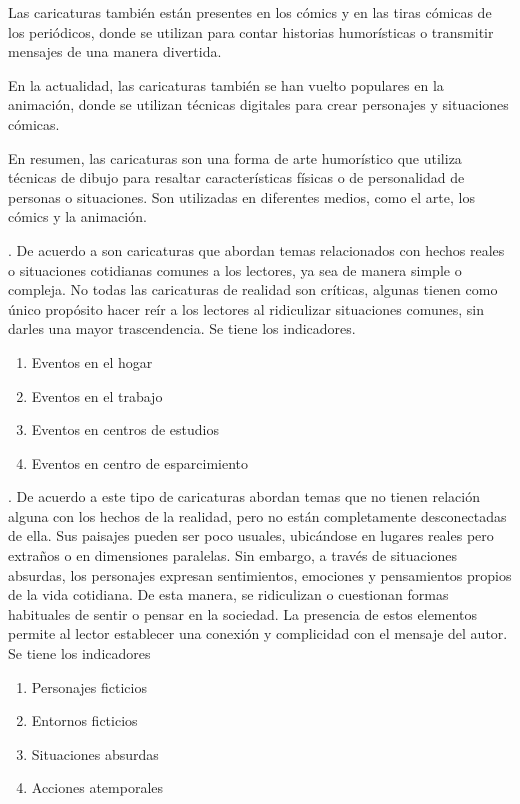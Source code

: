 \documentclass[12pt,a4paper]{article}
\begin{document}
Las caricaturas también están presentes en los cómics y en las tiras cómicas de los periódicos, donde se utilizan para contar historias humorísticas o transmitir mensajes de una manera divertida.

En la actualidad, las caricaturas también se han vuelto populares en la animación, donde se utilizan técnicas digitales para crear personajes y situaciones cómicas.

En resumen, las caricaturas son una forma de arte humorístico que utiliza técnicas de dibujo para resaltar características físicas o de personalidad de personas o situaciones. Son utilizadas en diferentes medios, como el arte, los cómics y la animación.

\noindent\textbf{\dimi}. De acuerdo a \cite{gray_caricaturas_2015}
son caricaturas que abordan temas relacionados con hechos reales o situaciones cotidianas comunes a los lectores, ya sea de manera simple o compleja. No todas las caricaturas de realidad son críticas, algunas tienen como único propósito hacer reír a los lectores al ridiculizar situaciones comunes, sin darles una mayor trascendencia. Se tiene los indicadores.
\begin{enumerate}
\item  Eventos en el hogar
\item  Eventos en el trabajo
\item  Eventos  en centros de estudios
\item  Eventos en centro de esparcimiento
\end{enumerate}




\noindent\textbf{\dimii}.	De acuerdo a \cite{gray_caricaturas_2015} este tipo de caricaturas abordan temas que no tienen relación alguna con los hechos de la realidad, pero no están completamente desconectadas de ella. Sus paisajes pueden ser poco usuales, ubicándose en lugares reales pero extraños o en dimensiones paralelas. Sin embargo, a través de situaciones absurdas, los personajes expresan sentimientos, emociones y pensamientos propios de la vida cotidiana. De esta manera, se ridiculizan o cuestionan formas habituales de sentir o pensar en la sociedad. La presencia de estos elementos permite al lector establecer una conexión y complicidad con el mensaje del autor. Se tiene los indicadores
\begin{enumerate}
	\item  Personajes ficticios
	\item Entornos ficticios
	\item  Situaciones absurdas
	\item  Acciones atemporales
\end{enumerate}
\end{document}
